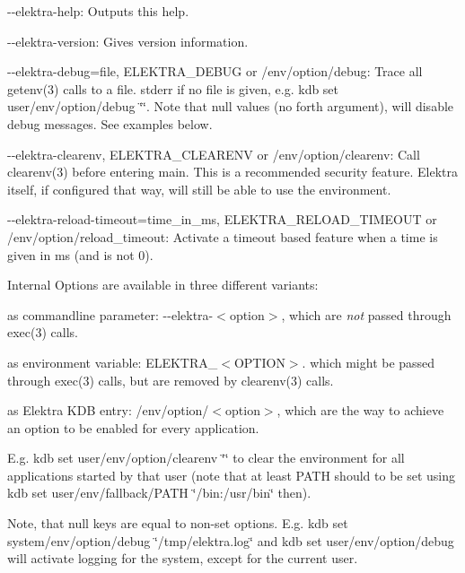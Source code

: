 \begin{DoxyItemize}
\item {\ttfamily -\/-\/elektra-\/help}\+: Outputs this help.
\item {\ttfamily -\/-\/elektra-\/version}\+: Gives version information.
\item {\ttfamily -\/-\/elektra-\/debug=file}, {\ttfamily E\+L\+E\+K\+T\+R\+A\+\_\+\+D\+E\+B\+U\+G} or {\ttfamily /env/option/debug}\+: Trace all getenv(3) calls to a file. stderr if no file is given, e.\+g. {\ttfamily kdb set user/env/option/debug \char`\"{}\char`\"{}}. Note that null values (no forth argument), will disable debug messages. See examples below.
\item {\ttfamily -\/-\/elektra-\/clearenv}, {\ttfamily E\+L\+E\+K\+T\+R\+A\+\_\+\+C\+L\+E\+A\+R\+E\+N\+V} or {\ttfamily /env/option/clearenv}\+: Call clearenv(3) before entering main. This is a recommended security feature. Elektra itself, if configured that way, will still be able to use the environment.
\item {\ttfamily -\/-\/elektra-\/reload-\/timeout=time\+\_\+in\+\_\+ms}, {\ttfamily E\+L\+E\+K\+T\+R\+A\+\_\+\+R\+E\+L\+O\+A\+D\+\_\+\+T\+I\+M\+E\+O\+U\+T} or {\ttfamily /env/option/reload\+\_\+timeout}\+: Activate a timeout based feature when a time is given in ms (and is not 0).
\end{DoxyItemize}

Internal Options are available in three different variants\+:


\begin{DoxyEnumerate}
\item as commandline parameter\+: {\ttfamily -\/-\/elektra-\/$<$option$>$}, which are {\itshape not} passed through exec(3) calls.
\item as environment variable\+: {\ttfamily E\+L\+E\+K\+T\+R\+A\+\_\+$<$O\+P\+T\+I\+O\+N$>$}. which might be passed through exec(3) calls, but are removed by clearenv(3) calls.
\item as Elektra K\+D\+B entry\+: {\ttfamily /env/option/$<$option$>$}, which are the way to achieve an option to be enabled for every application.

E.\+g. {\ttfamily kdb set user/env/option/clearenv \char`\"{}\char`\"{}} to clear the environment for all applications started by that user (note that at least {\ttfamily P\+A\+T\+H} should to be set using {\ttfamily kdb set user/env/fallback/\+P\+A\+T\+H \char`\"{}/bin\+:/usr/bin\char`\"{}} then).

Note, that null keys are equal to non-\/set options. E.\+g. {\ttfamily kdb set system/env/option/debug \char`\"{}/tmp/elektra.\+log\char`\"{}} and {\ttfamily kdb set user/env/option/debug} will activate logging for the system, except for the current user.
\end{DoxyEnumerate}

